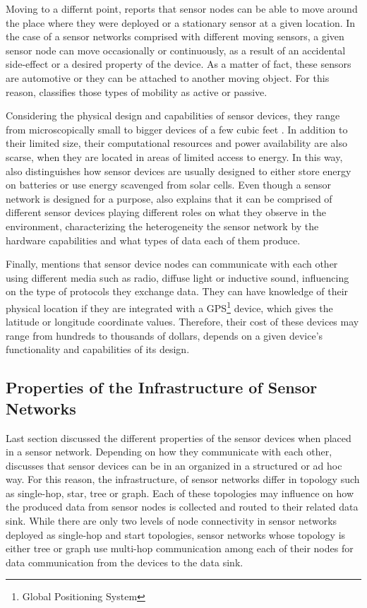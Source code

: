 Moving to a differnt point, \cite{sn-intro01} reports that sensor nodes can be
able to move around the place where they were deployed or a stationary sensor
at a given location. In the case of a sensor networks comprised with different
moving sensors, a given sensor node can move occasionally or continuously, as
a result of an accidental side-effect or a desired property of the device. As
a matter of fact, these sensors are automotive or they can be attached to
another moving object. For this reason, \cite{sn-intro01} classifies those
types of mobility as active or passive.

Considering the physical design and capabilities of sensor devices, they range
from microscopically small to bigger devices of a few cubic feet
\cite{sn-intro02}. In addition to their limited size, their computational
resources and power availability are also scarse, when they are located in
areas of limited access to energy. In this way, \cite{sn-intro01} also
distinguishes how sensor devices are usually designed to either store energy on
batteries or use energy scavenged from solar cells. Even though a sensor
network is designed for a purpose, \cite{sn-intro01} also explains that it can
be comprised of different sensor devices playing different roles on what they
observe in the environment, characterizing the heterogeneity the sensor
network by the hardware capabilities and what types of data each of them
produce.

Finally, \cite{sn-intro01} mentions that sensor device nodes can communicate
with each other using different media such as radio, diffuse light or
inductive sound, influencing on the type of protocols they exchange data. They
can have knowledge of their physical location if they are integrated with a
GPS\footnote{Global Positioning System} device, which gives the latitude or
longitude coordinate values. Therefore, their cost of these devices may range
from hundreds to thousands of dollars, depends on a given device's functionality
and capabilities of its design.

\subsection{Properties of the Infrastructure of Sensor Networks}
\label{sec:sn-infrastructure}

Last section discussed the different properties of the sensor devices when
placed in a sensor network. Depending on how they communicate with each other,
\cite{sn-intro02} discusses that sensor devices can be in an organized in a
structured or ad hoc way. For this reason, the infrastructure, of sensor
networks differ in topology such as single-hop, star, tree or  graph. Each of
these topologies may influence on how the produced data from sensor nodes is
collected and routed to their related data sink. While there are only two
levels of node connectivity in sensor networks deployed as single-hop and start
topologies, sensor networks whose topology is either tree or graph use
multi-hop communication among each of their nodes for data communication from
the devices to the data sink.


